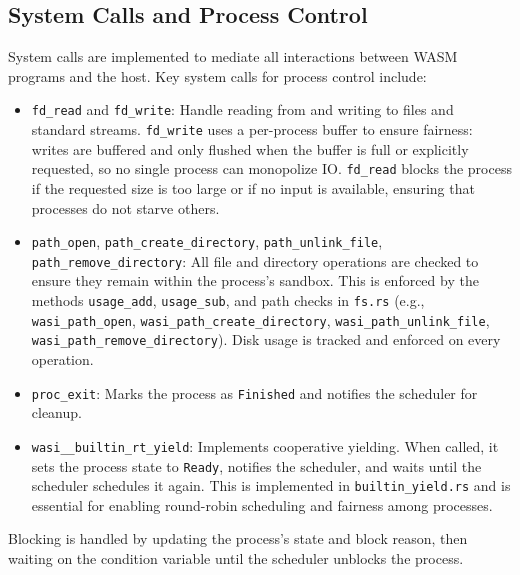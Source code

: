 \documentclass[10pt,a4paper,twocolumn]{IEEEtran}
\begin{document}
\subsection*{System Calls and Process Control}
System calls are implemented to mediate all interactions between WASM programs and the host. Key system calls for process control include:
\begin{itemize}
    \item \texttt{fd\_read} and \texttt{fd\_write}: Handle reading from and writing to files and standard streams. \texttt{fd\_write} uses a per-process buffer to ensure fairness: writes are buffered and only flushed when the buffer is full or explicitly requested, so no single process can monopolize IO. \texttt{fd\_read} blocks the process if the requested size is too large or if no input is available, ensuring that processes do not starve others.
    \item \texttt{path\_open}, \texttt{path\_create\_directory}, \texttt{path\_unlink\_file}, \texttt{path\_remove\_directory}: All file and directory operations are checked to ensure they remain within the process's sandbox. This is enforced by the methods \texttt{usage\_add}, \texttt{usage\_sub}, and path checks in \texttt{fs.rs} (e.g., \texttt{wasi\_path\_open}, \texttt{wasi\_path\_create\_directory}, \texttt{wasi\_path\_unlink\_file}, \texttt{wasi\_path\_remove\_directory}). Disk usage is tracked and enforced on every operation.
    \item \texttt{proc\_exit}: Marks the process as \texttt{Finished} and notifies the scheduler for cleanup.
    \item \texttt{wasi\_\_builtin\_rt\_yield}: Implements cooperative yielding. When called, it sets the process state to \texttt{Ready}, notifies the scheduler, and waits until the scheduler schedules it again. This is implemented in \texttt{builtin\_yield.rs} and is essential for enabling round-robin scheduling and fairness among processes.
\end{itemize}
Blocking is handled by updating the process's state and block reason, then waiting on the condition variable until the scheduler unblocks the process.
\end{document}
